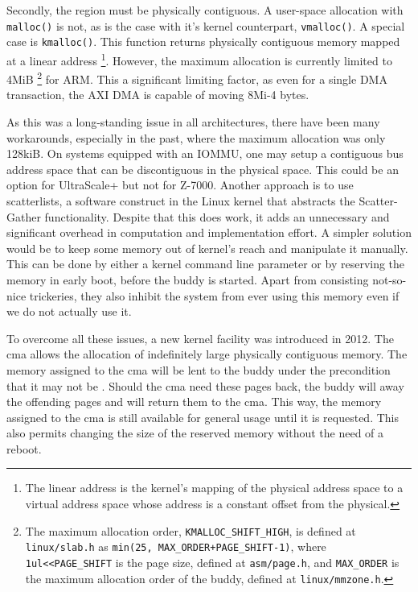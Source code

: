 Secondly, the region must be physically contiguous. A user-space allocation with \texttt{malloc()} is not,
as is the case with it's kernel counterpart, \texttt{vmalloc()}. A special case is \texttt{kmalloc()}.
This function returns physically contiguous memory mapped at a linear address
\footnote{The linear address is the kernel's mapping of the physical address space
to a virtual address space whose address is a constant offset from the physical.}.
However, the maximum allocation is currently limited to 4MiB
\footnote{The maximum allocation order, \texttt{KMALLOC\_SHIFT\_HIGH}, is defined
at \texttt{linux/slab.h} as \texttt{min(25, MAX\_ORDER+PAGE\_SHIFT-1)},
where \texttt{1ul<<PAGE\_SHIFT} is the page size, defined at \texttt{asm/page.h},
and \texttt{MAX\_ORDER} is the maximum allocation order of the \gls{buddy}, 
defined at \texttt{linux/mmzone.h}.}
for ARM. This a significant limiting factor, as even for a single DMA transaction, the AXI DMA is
capable of moving 8Mi-4 bytes.

As this was a long-standing issue in all architectures, there have been many workarounds, especially
in the past, where the maximum allocation was only 128kiB. On systems equipped with an IOMMU,
one may setup a contiguous bus address space that can be discontiguous in the physical space.
This could be an option for UltraScale+ but not for Z-7000. Another approach is to use
\glspl{scatterlist}, a software construct in the Linux kernel that abstracts the Scatter-Gather functionality.
Despite that this does work, it adds an unnecessary and significant overhead in computation and implementation effort.
A simpler solution would be to keep some memory out of kernel's reach and manipulate it manually.
This can be done by either a kernel command line parameter or by reserving the memory in early
boot, before the \gls{buddy} is started.
Apart from consisting not-so-nice trickeries, they also inhibit the system from ever using this memory
even if we do not actually use it.

To overcome all these issues, a new kernel facility was introduced in 2012. The \gls{cma}
allows the allocation of indefinitely large physically contiguous memory.
The memory assigned to the \gls{cma} will be lent to the \gls{buddy} under the precondition
that it may not be . Should the \gls{cma} need
these pages back, the \gls{buddy} will  away the offending pages 
and will return them to the \gls{cma}. This way, the memory assigned to the \gls{cma} is
still available for general usage until it is requested. This also permits changing the
size of the reserved memory without the need of a reboot.


